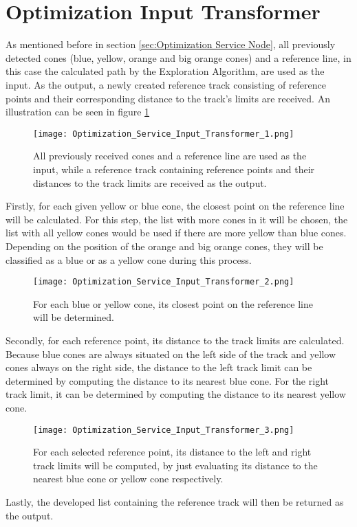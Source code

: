 \section{Optimization Input Transformer} \label{sec:Optimization Input Transformer}
As mentioned before in section \ref{sec:Optimization Service Node}, all previously detected cones (blue, yellow, orange and big orange cones) and a reference line, in this case the calculated path by the Exploration Algorithm, are used as the input. As the output, a newly created reference track consisting of reference points and their corresponding distance to the track's limits are received. An illustration can be seen in figure \ref{fig:Optimization Service Input Transformer 1}
\begin{figure}[H]
    \centering
    \texttt{[image: Optimization\_Service\_Input\_Transformer\_1.png]}
    \caption{All previously received cones and a reference line are used as the input, while a reference track containing reference points and their distances to the track limits are received as the output.}
    \label{fig:Optimization Service Input Transformer 1}
\end{figure}
Firstly, for each given yellow or blue cone, the closest point on the reference line will be calculated. For this step, the list with more cones in it will be chosen, the list with all yellow cones would be used if there are more yellow than blue cones. Depending on the position of the orange and big orange cones, they will be classified as a blue or as a yellow cone during this process.
\begin{figure}[H]
    \centering
    \texttt{[image: Optimization\_Service\_Input\_Transformer\_2.png]}
    \caption{For each blue or yellow cone, its closest point on the reference line will be determined.}
    \label{fig:Optimization Service Input Transformer 2}
\end{figure}
Secondly, for each reference point, its distance to the track limits are calculated. Because blue cones are always situated on the left side of the track and yellow cones always on the right side, the distance to the left track limit can be determined by computing the distance to its nearest blue cone. For the right track limit, it can be determined by computing the distance to its nearest yellow cone.
\begin{figure}[H]
    \centering
    \texttt{[image: Optimization\_Service\_Input\_Transformer\_3.png]}
    \caption{For each selected reference point, its distance to the left and right track limits will be computed, by just evaluating its distance to the nearest blue cone or yellow cone respectively.}
    \label{fig:Optimization Service Input Transformer 3}
\end{figure}
Lastly, the developed list containing the reference track will then be returned as the output.

